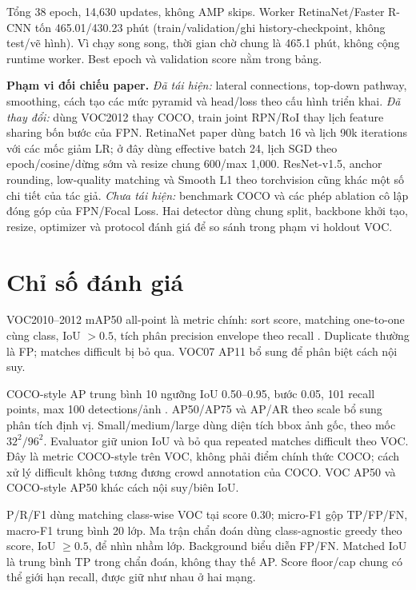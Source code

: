 Tổng 38 epoch, 14,630 updates, không AMP skips. Worker RetinaNet/Faster R-CNN
tốn 465.01/430.23 phút (train/validation/ghi history-checkpoint, không test/vẽ hình).
Vì chạy song song, thời gian chờ chung là 465.1 phút, không cộng runtime worker.
Best epoch và validation score nằm trong bảng.

\noindent\textbf{Phạm vi đối chiếu paper.}
\textit{Đã tái hiện:} lateral connections, top-down pathway, smoothing,
cách tạo các mức pyramid và head/loss theo cấu hình triển khai.
\textit{Đã thay đổi:} dùng VOC2012 thay COCO, train joint RPN/RoI thay lịch
feature sharing bốn bước của FPN. RetinaNet paper dùng batch 16 và lịch
90k iterations với các mốc giảm LR; ở đây dùng effective batch 24,
lịch SGD theo epoch/cosine/dừng sớm và resize chung 600/max 1,000.
ResNet-v1.5, anchor rounding, low-quality matching và Smooth L1 theo torchvision
cũng khác một số chi tiết của tác giả.
\textit{Chưa tái hiện:} benchmark COCO và các phép ablation cô lập đóng góp
của FPN/Focal Loss. Hai detector dùng chung split, backbone khởi tạo, resize,
optimizer và protocol đánh giá để so sánh trong phạm vi holdout VOC.

\section{Chỉ số đánh giá}
VOC2010--2012 mAP50 all-point là metric chính: sort score, matching
one-to-one cùng class, IoU $>0.5$, tích phân precision envelope theo recall
\cite{vocdevkit}. Duplicate thường là FP; matches difficult bị bỏ qua.
VOC07 AP11 bổ sung để phân biệt cách nội suy.

COCO-style AP trung bình 10 ngưỡng IoU 0.50--0.95, bước 0.05, 101 recall
points, max 100 detections/ảnh \cite{cocometrics}. AP50/AP75 và AP/AR theo
scale bổ sung phân tích định vị. Small/medium/large dùng diện tích bbox ảnh
gốc, theo mốc $32^2/96^2$. Evaluator giữ union IoU và bỏ qua repeated
matches difficult theo VOC. Đây là metric COCO-style trên VOC, không phải
điểm chính thức COCO; cách xử lý difficult không tương đương crowd annotation
của COCO. VOC AP50 và COCO-style AP50 khác cách nội suy/biên IoU.

P/R/F1 dùng matching class-wise VOC tại score 0.30; micro-F1 gộp TP/FP/FN,
macro-F1 trung bình 20 lớp. Ma trận chẩn đoán dùng class-agnostic greedy
theo score, IoU $\geq 0.5$, để nhìn nhầm lớp. Background biểu diễn FP/FN.
Matched IoU là trung bình TP trong chẩn đoán, không thay thế AP.
Score floor/cap chung có thể giới hạn recall, được giữ như nhau ở hai mạng.

